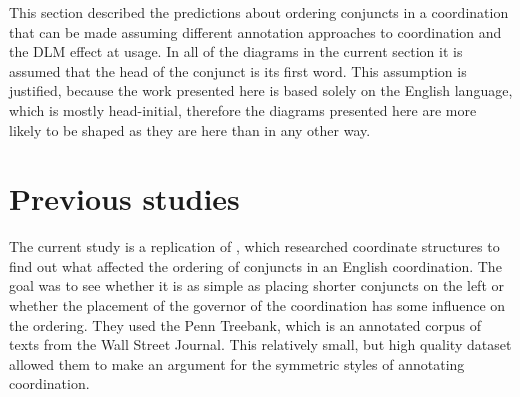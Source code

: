 \newlength{\treeheight}
\newlength{\treewidth}

This section described the predictions about ordering conjuncts in a coordination that can be made assuming different annotation approaches to coordination and the DLM effect at usage. In all of the diagrams in the current section it is assumed that the head of the conjunct is its first word. This assumption is justified, because the work presented here is based solely on the English language, which is mostly head-initial, therefore the diagrams presented here are more likely to be shaped as they are here than in any other way.







\section{Previous studies}\label{sec:previous}
The current study is a replication of \cite{prz:woz:23}, which researched coordinate structures to find out what affected the ordering of conjuncts in an English coordination. The goal was to see whether it is as simple as placing shorter conjuncts on the left or whether the placement of the governor of the coordination has some influence on the ordering. They used the Penn Treebank, which is an annotated corpus of texts from the Wall Street Journal. This relatively small, but high quality dataset allowed them to make an argument for the symmetric styles of annotating coordination. 

